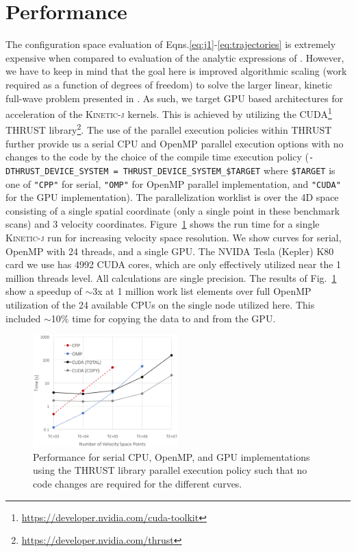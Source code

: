 \documentclass[final,5p,times,twocolumn]{elsarticle}
\newcommand{\kj}{\textsc{Kinetic-j}\xspace}
\begin{document}
\section{Performance}
\label{section:performance}
%
The configuration space evaluation of Eqns.\ref{eq:j1}-\ref{eq:trajectories} is extremely expensive when compared to evaluation of the analytic expressions of \cite{stix}. However, we have to keep in mind that the goal here is improved algorithmic scaling (work required as a function of degrees of freedom) to solve the larger linear, kinetic full-wave problem presented in \cite{green2014}. As such, we target GPU based architectures for acceleration of the \kj kernels. This is achieved by utilizing the CUDA\footnote{\url{https://developer.nvidia.com/cuda-toolkit}} THRUST library\footnote{\url{https://developer.nvidia.com/thrust}}. The use of the parallel execution policies within THRUST further provide us a serial CPU and OpenMP parallel execution options with no changes to the code by the choice of the compile time execution policy (\texttt{-DTHRUST\_DEVICE\_SYSTEM = THRUST\_DEVICE\_SYSTEM\_\$TARGET} where \texttt{\$TARGET} is one of \texttt{"CPP"} for serial, \texttt{"OMP"} for OpenMP parallel implementation, and \texttt{"CUDA"} for the GPU implementation). The parallelization worklist is over the 4D space consisting of a single spatial coordinate (only a single point in these benchmark scans) and 3 velocity coordinates. Figure~\ref{fig:scaling} shows the run time for a single \kj run for increasing velocity space resolution. We show curves for serial, OpenMP with 24 threads, and a single GPU. The NVIDA Tesla (Kepler) K80 card we use has 4992 CUDA cores, which are only effectively utilized near the 1 million threads level. All calculations are single precision. The results of Fig.~\ref{fig:scaling} show a speedup of $\sim$3x at 1 million work list elements over full OpenMP utilization of the 24 available CPUs on the single node utilized here. This included $\sim$10\% time for copying the data to and from the GPU.  
%
\begin{figure}
\centering
\includegraphics[width=0.5\textwidth]{figures/scaling}
\caption{Performance for serial CPU, OpenMP, and GPU implementations using the THRUST library parallel execution policy such that no code changes are required for the different curves.}
\label{fig:scaling}
\end{figure}
%
\end{document}
